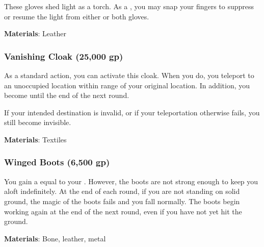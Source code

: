 These gloves shed light as a torch.
As a , you may snap your fingers to suppress or resume the light from either or both gloves.



\vspace{0.25em}
\textbf{Materials}: Leather


\lowercase{\hypertarget{item:Vanishing Cloak}{}}\label{item:Vanishing Cloak}
\hypertarget{item:Vanishing Cloak}{\subsubsection{Vanishing Cloak\hfill{} (25,000 gp)}}

As a standard action, you can activate this cloak.
When you do, you teleport to an unoccupied location within \rngmed range of your original location.
In addition, you become  until the end of the next round.

If your intended destination is invalid, or if your teleportation otherwise fails, you still become invisible.



\vspace{0.25em}
\textbf{Materials}: Textiles


\lowercase{\hypertarget{item:Winged Boots}{}}\label{item:Winged Boots}
\hypertarget{item:Winged Boots}{\subsubsection{Winged Boots\hfill{} (6,500 gp)}}

You gain a  equal to your .
However, the boots are not strong enough to keep you aloft indefinitely.
At the end of each round, if you are not standing on solid ground, the magic of the boots fails and you fall normally.
The boots begin working again at the end of the next round, even if you have not yet hit the ground.



\vspace{0.25em}
\textbf{Materials}: Bone, leather, metal
